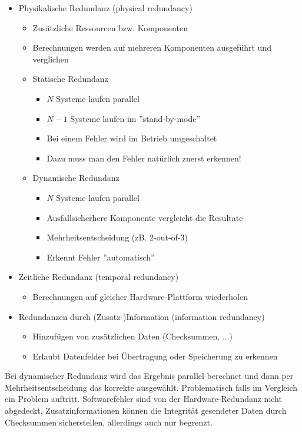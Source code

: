 \documentclass[a4paper,12pt]{article}
\begin{document}
\begin{itemize}
\item Physikalische Redundanz (physical redundancy)
	\begin{itemize}
	\item Zusätzliche Ressourcen bzw. Komponenten
	\item Berechnungen werden auf mehreren Komponenten ausgeführt und verglichen
	\item Statische Redundanz
		\begin{itemize}
		\item $N$ Systeme laufen parallel
		\item $N-1$ Systeme laufen im  ''stand-by-mode''
		\item Bei einem Fehler wird im Betrieb umgeschaltet
		\item Dazu muss man den Fehler natürlich zuerst erkennen!
		\end{itemize}
	\item Dynamische Redundanz
		\begin{itemize}
		\item $N$ Systeme laufen parallel
		\item Ausfallsicherhere Komponente vergleicht die Resultate
		\item Mehrheitsentscheidung (zB. 2-out-of-3)
		\item Erkennt Fehler ''automatisch''
		\end{itemize}
	\end{itemize}
\item Zeitliche Redundanz (temporal redundancy)
	\begin{itemize}
	\item Berechnungen auf gleicher Hardware-Plattform wiederholen
	\end{itemize}
\item Redundanzen durch (Zusatz-)Information (information redundancy)
	\begin{itemize}
	\item Hinzufügen von zusätzlichen Daten (Checksummen, ...)
	\item Erlaubt Datenfelder bei Übertragung oder Speicherung zu erkennen
	\end{itemize}
\end{itemize}
Bei dynamischer Redundanz wird das Ergebnis parallel berechnet und dann per Mehrheitsentscheidung das korrekte ausgewählt. Problematisch falls im Vergleich ein Problem auftritt. Softwarefehler sind von der Hardware-Redundanz nicht abgedeckt.
Zusatzinformationen können die Integrität gesendeter Daten durch Checksummen sicherstellen, allerdings auch nur begrenzt.\\
\end{document}
